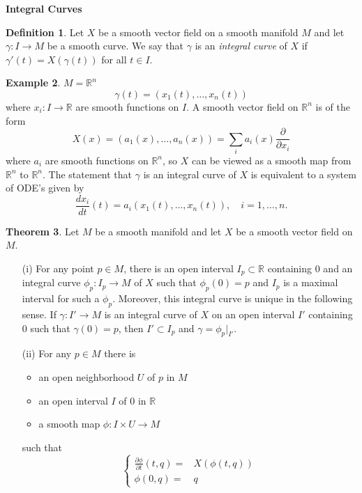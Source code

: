 \documentclass{amsart}
\numberwithin{equation}{section}
\newcommand{\bR}{\mathbb{R}}
\theoremstyle{definition}
\newtheorem{definition}{Definition} [section]
\newtheorem{example}[definition]{Example}
\theoremstyle{theorem}
\newtheorem{theorem}[definition]{Theorem}
\begin{document}
\noindent
{\bf\large Integral Curves}

\begin{definition}
Let $X$ be a smooth vector field on a smooth manifold $M$ and let $\gamma : I \to M$ be a smooth curve. We say that $\gamma$ is an 
{\em integral curve} of $X$ if $\gamma'(t) = X(\gamma(t))$ for all $t \in I$. 
\end{definition}

\begin{example} $M = \mathbb{R}^n$ 
$$
\gamma(t) = (x_1(t), \ldots, x_n(t))
$$
where $x_i:I\to \bR$ are smooth functions on $I$. A smooth vector field on $\bR^n$ is
of the form
$$
X(x) = (a_1(x), \ldots, a_n(x)) =\sum_i a_i(x) \frac{\partial}{\partial x_i}
$$
where $a_i$ are smooth functions on $\bR^n$, so $X$ can be viewed as a smooth map from 
$\bR^n$ to $\bR^n$. The statement that $\gamma$ is an integral curve of $X$ is equivalent to a system of ODE's given by 
\[
\frac{d x_i}{dt}(t) = a_i(x_1(t), \ldots, x_n(t)),\quad i=1,\ldots,n.
\]
\end{example}

\begin{theorem}\label{flow-existence}
Let $M$ be a smooth manifold and let $X$ be a smooth vector field on $M$.
\begin{enumerate}
\item[(i)] For any point $p \in M$, there is an open interval $I_p \subset \mathbb{R}$ containing $0$ and an integral curve $\phi_p : I_p \to M$ of $X$ such that $\phi_p(0) = p$ and  $I_p$ is a maximal interval for such a $\phi_p$. Moreover, this integral curve is unique in the following sense. If $\gamma : I' \to M$ is an integral curve of $X$ on an open interval $I'$ containing $0$ such that $\gamma(0) = p$, then $I' \subset I_p$ and $\gamma = \phi_p|_{I'}$. 
\item[(ii)] For any $p \in M$ there is 
\begin{itemize}
\item an open neighborhood $U$ of $p$ in $M$
\item an open interval $I$ of $0$ in $\mathbb{R}$
\item a smooth map $\phi : I \times U \to M$
\end{itemize}
such that 
$$
\begin{cases}
\frac{\partial \phi}{\partial t}(t,q) =& X(\phi(t,q))\\
\phi(0,q)=&q
\end{cases}
$$
\end{enumerate}
\end{theorem}
\end{document}
